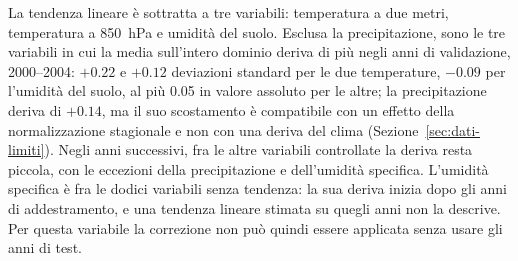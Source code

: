 La tendenza lineare è sottratta a tre variabili: temperatura a due metri, temperatura a 850~hPa e umidità del suolo. Esclusa la precipitazione, sono le tre variabili in cui la media sull'intero dominio deriva di più negli anni di validazione, 2000--2004: $+0.22$ e $+0.12$ deviazioni standard per le due temperature, $-0.09$ per l'umidità del suolo, al più 0.05 in valore assoluto per le altre; la precipitazione deriva di $+0.14$, ma il suo scostamento è compatibile con un effetto della normalizzazione stagionale e non con una deriva del clima (Sezione~\ref{sec:dati-limiti}). Negli anni successivi, fra le altre variabili controllate la deriva resta piccola, con le eccezioni della precipitazione e dell'umidità specifica. L'umidità specifica è fra le dodici variabili senza tendenza: la sua deriva inizia dopo gli anni di addestramento, e una tendenza lineare stimata su quegli anni non la descrive. Per questa variabile la correzione non può quindi essere applicata senza usare gli anni di test.
